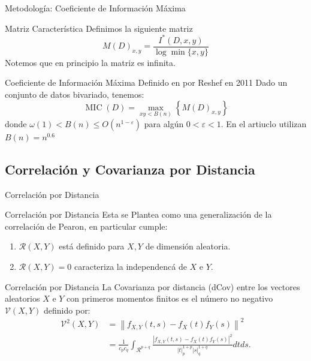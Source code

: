 \documentclass{beamer}
\begin{document}
\begin{frame}{Metodología: Coeficiente de Información Máxima}
    \begin{block}{Matriz Característica}
        Definimos la siguiente matriz       
        \begin{equation}
	    	M(D)_{x, y}=\frac{I^{*}(D, x, y)}{\log \min \{x, y\}}
        \end{equation}
        Notemos que en principio la matriz es infinita.
    \end{block}
     

    \begin{block}{Coeficiente de Información Máxima}
        Definido en por Reshef en 2011 \cite{reshef2011} Dado un conjunto de datos bivariado, tenemos:
        \begin{equation}\label{MIC}
	    	\operatorname{MIC}(D)=\max _{x y<B(n)}\left\{M(D)_{x, y}\right\}
        \end{equation}
        donde $\omega(1)<B(n) \leq O\left(n^{1-\varepsilon}\right)$ para alg\'un $0<\varepsilon<1$. En el artiuclo utilizan $B(n)=n^{0.6}$
    \end{block}
\end{frame}

\subsection{Correlaci\'on y Covarianza por Distancia}

\begin{frame}{Correlaci\'on por Distancia}

    \begin{block}{Correlaci\'on por Distancia}
        Esta se Plantea como una generalizaci\'on de la correlaci\'on de Pearon, en particular cumple:
        \begin{enumerate}
            \item $\mathcal{R}(X,Y)$ est\'a definido para $X,Y$ de dimensi\'on aleatoria.
            \item $\mathcal{R}(X,Y) = 0$ caracteriza la independenc\'a de $X$ e $Y$.	 
        \end{enumerate}
    \end{block}

    \begin{block}{Correlaci\'on por Distancia}
        La Covarianza por distancia (dCov) entre los vectores aleatorios $X$ e $Y$ con primeros momentos finitos es el n\'umero no negativo $\mathcal{V}(X, Y)$ definido por:
        \begin{equation}
            \begin{aligned}\label{dcov_formula}
                \mathcal{V}^2(X, Y) & =\left\|f_{X, Y}(t, s)-f_X(t) f_Y(s)\right\|^2 \\
                & =\frac{1}{c_p c_q} \int_{\mathcal{R}^{p+q}} \frac{\left|f_{X, Y}(t, s)-f_X(t) f_Y(s)\right|^2}{|t|_p^{1+p}|s|_q^{1+q}} d t d s .
                \end{aligned}
        \end{equation}
    \end{block}
\end{frame}
\end{document}

